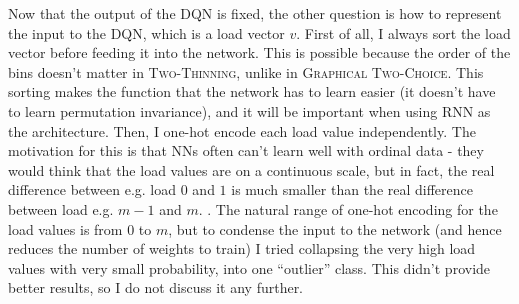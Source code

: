 Now that the output of the DQN is fixed, the other question is how to represent the input to the DQN, which is a load vector $v$. First of all, I always sort the load vector before feeding it into the network. This is possible because the order of the bins doesn't matter in \textsc{Two-Thinning}, unlike in \textsc{Graphical Two-Choice}. This sorting makes the function that the network has to learn easier (it doesn't have to learn permutation invariance), and it will be important when using RNN as the architecture. Then, I one-hot encode each load value independently. The motivation for this is that NNs often can't learn well with ordinal data - they would think that the load values are on a continuous scale, but in fact, the real difference between e.g. load $0$ and $1$ is much smaller than the real difference between load e.g. $m-1$ and $m$. . The natural range of one-hot encoding for the load values is from $0$ to $m$, but to condense the input to the network (and hence reduces the number of weights to train) I tried collapsing the very high load values with very small probability, into one ``outlier'' class. This didn't provide better results, so I do not discuss it any further.


